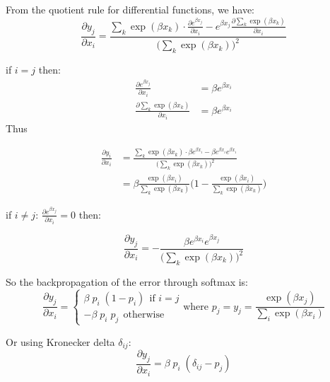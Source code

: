 \documentclass[11pt]{article}
\newcommand{\0}{\mat{0}}
\newenvironment{solution}{\vspace{.25cm}\noindent{\it Solution:}}{}
\begin{document}
\begin{solution}
From the quotient rule for differential functions, we have:
\[
	\frac{\partial y_j}{\partial x_i} = \frac{\sum_k \exp(\beta x_k) \cdot \frac{\partial e^{\beta x_j}}{\partial x_i}  - e^{\beta x_j} \frac{\partial \sum_k \exp(\beta x_k)} {\partial x_i}} {\bigg(\sum_k \exp(\beta x_k)\bigg)^2}
\]

if $i=j$ then:
\begin{align*}
	\frac{\partial e^{\beta x_j}}{\partial x_i}  &= \beta  e^{\beta x_i} \\
	 \frac{\partial \sum_k \exp(\beta x_k)} {\partial x_i} &= \beta e^{\beta x_i}
\end{align*}
Thus

\begin{align*}
	\frac{\partial y_i}{\partial x_i} &=  \frac{\sum_k \exp(\beta x_k) \cdot \beta  e^{\beta x_i} -  \beta e^{\beta x_i}  e^{\beta x_i} }  {\bigg(\sum_k \exp(\beta x_k)\bigg)^2} \\
	&= \beta \frac{\exp(\beta x_i)} {\sum_k \exp(\beta x_k)} \Bigg(1- \frac{\exp(\beta x_i)}{{\sum_k \exp(\beta x_k)}} \Bigg)
\end{align*}

if $i \ne j$: $\frac{\partial e^{\beta x_j}}{\partial x_i} = 0$ then:

\[
	\frac{\partial y_j}{\partial x_i} = -  \frac{\beta e^{\beta x_i}  e^{\beta x_j} }  {\bigg(\sum_k \exp(\beta x_k)\bigg)^2} 
\]

So the backpropagation of the error through softmax is:
\begin{equation}
\frac{\partial y_j}{\partial x_i}=
\begin{cases}
 \beta  \; p_i  \; (1-p_i) ~~\text{if } i = j\\    
 -\beta \;  p_i \; p_j ~~ \text{otherwise}
\end{cases}
\text{where } p_j = y_j = \frac{\exp(\beta x_j)}{\sum_i \exp(\beta x_i)} 
\end{equation}
 
 Or using Kronecker delta $\delta_{ij}$:
 \begin{equation}
	\frac{\partial y_j}{\partial x_i} =  \beta  \; p_i  \; (\delta_{ij}-p_j) 
\end{equation}

 \end{solution}
\end{document}
